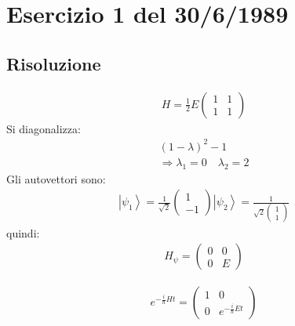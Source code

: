 \section{Esercizio 1 del 30/6/1989} %

\subsection{Risoluzione} %
\begin{equation}\begin{split}
H=\frac{1}{2}E\left(\begin{matrix}1&1\\1&1\end{matrix}\right)
\end{split}\end{equation}
Si diagonalizza:
\begin{equation}\begin{split}
\left(1-\lambda\right)^2-1\\
\Longrightarrow \lambda_1=0 \quad \lambda_2=2
\end{split}\end{equation}
Gli autovettori sono:
\begin{equation}\begin{split}
\left |\psi _1 \right\rangle=\frac{1}{\sqrt{2}}\left(\begin{matrix}1\\-1\end{matrix}\right)
\left |\psi _2 \right\rangle=\frac{1}{\sqrt{2}\left(\begin{matrix}1\\1\end{matrix}\right)}
\end{split}\end{equation}
quindi:
\begin{equation}\begin{split}
H_\psi =\left(\begin{matrix}0&0\\0&E\end{matrix}\right)
\end{split}\end{equation}

\begin{equation}\begin{split}
e^{-\frac{i}{\hbar }Ht}=\left(\begin{matrix}1&0\\0&e^{-\frac{i}{\hbar }Et}\end{matrix}\right)
\end{split}\end{equation}

